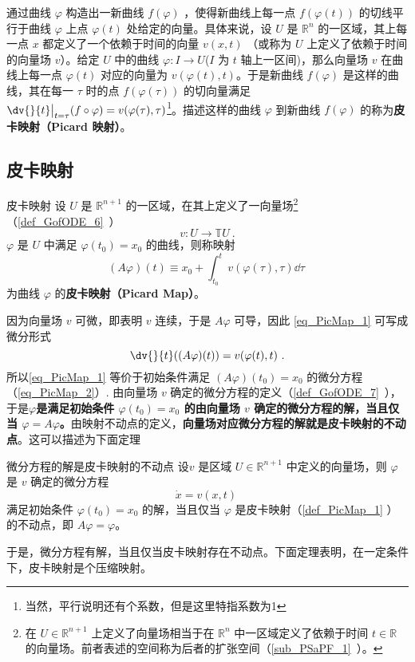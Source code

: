 
\cite{Arnold}通过曲线 $\varphi$ 构造出一新曲线 $f(\varphi)$ ，使得新曲线上每一点 $f(\varphi(t))$ 的切线平行于曲线 $\varphi$ 上点 $\varphi(t)$ 处给定的向量。具体来说，设 $U$ 是 $\mathbb R^n$ 的一区域，其上每一点 $x$ 都定义了一个依赖于时间的向量 $v(x,t)$ （或称为 $U$ 上定义了依赖于时间的向量场 $v$）。给定 $U$ 中的曲线 $\varphi:I\rightarrow U$($I$ 为 $t$ 轴上一区间)，那么向量场 $v$ 在曲线上每一点 $\varphi(t)$ 对应的向量为 $v(\varphi(t),t)$。于是新曲线 $f(\varphi)$ 是这样的曲线，其在每一 $\tau$ 时的点 $f(\varphi(\tau))$ 的切向量满足 $\dv{}{t}\big|_{t=\tau}(f\circ \varphi)=v(\varphi(\tau),\tau)$\footnote{当然，平行说明还有个系数，但是这里特指系数为1}。描述这样的曲线 $\varphi$ 到新曲线 $f(\varphi)$ 的称为\textbf{皮卡映射（Picard 映射）}。
\subsection{皮卡映射}
\begin{definition}{皮卡映射}\label{def_PicMap_1}
设 $U$ 是 $\mathbb R^{n+1}$ 的一区域，在其上定义了一向量场\footnote{在 $U\in\mathbb R^{n+1}$ 上定义了向量场相当于在 $\mathbb R^n$ 中一区域定义了依赖于时间 $t\in\mathbb R$ 的向量场。前者表述的空间称为后者的扩张空间（\autoref{sub_PSaPF_1}~）。}（\autoref{def_GofODE_6}~） 
\begin{equation}
v:U\rightarrow\mathbb TU~.
\end{equation}
$\varphi$ 是 $U$ 中满足 $\varphi(t_0)=x_0$ 的曲线，则称映射
\begin{equation}\label{eq_PicMap_1}
(A\varphi)(t)\equiv x_0+\int_{t_0}^{t}v(\varphi(\tau),\tau)\dd \tau~
\end{equation}
为曲线 $\varphi$ 的\textbf{皮卡映射（Picard Map）}。
\end{definition}

因为向量场 $v$ 可微，即表明 $v$ 连续，于是 $A\varphi$ 可导，因此 \autoref{eq_PicMap_1} 可写成微分形式
\begin{equation}\label{eq_PicMap_2}
\dv{}{t}((A\varphi)(t))=v(\varphi(t),t)~.
\end{equation}
所以\autoref{eq_PicMap_1} 等价于初始条件满足 $(A\varphi)(t_0)=x_0$ 的微分方程（\autoref{eq_PicMap_2}）. 由向量场 $v$ 确定的微分方程的定义（\autoref{def_GofODE_7}~），于是\textbf{$\varphi$是满足初始条件 $\varphi(t_0)=x_0$ 的由向量场 $v$ 确定的微分方程的解，当且仅当 $\varphi=A\varphi$。}由映射不动点的定义，\textbf{向量场对应微分方程的解就是皮卡映射的不动点}。这可以描述为下面定理
\begin{theorem}{微分方程的解是皮卡映射的不动点}\label{the_PicMap_1}
设$v$ 是区域 $U\in\mathbb R^{n+1}$ 中定义的向量场，则 $\varphi$ 是 $v$ 确定的微分方程
\begin{equation}\label{eq_PicMap_3}
\dot x=v(x,t)~
\end{equation}
满足初始条件 $\varphi(t_0)=x_0$ 的解，当且仅当 $\varphi$ 是皮卡映射（\autoref{def_PicMap_1} ）的不动点，即 $A\varphi=\varphi$。
\end{theorem}
于是，微分方程有解，当且仅当皮卡映射存在不动点。下面定理表明，在一定条件下，皮卡映射是个压缩映射。

